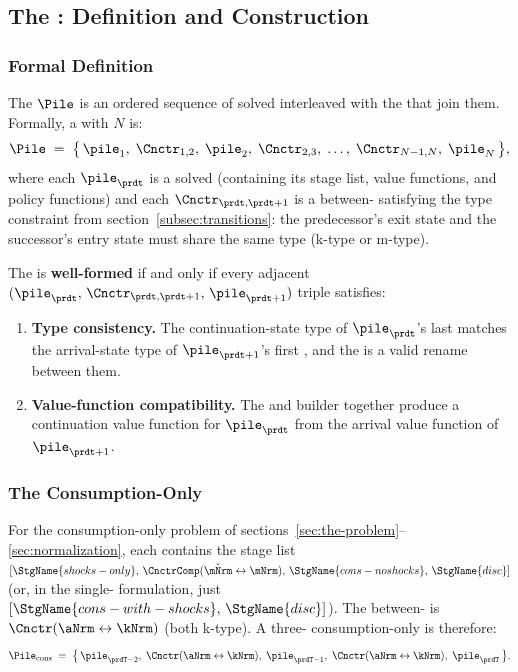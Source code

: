 \documentclass[SolvingMicroDSOPs]{subfiles}
\begin{document}
\subsection{The {\PileName}: Definition and Construction}\label{subsec:building-pile}

\subsubsection{Formal Definition}

The {\pileName} $\Pile$ is an ordered sequence of solved {\intervals}
interleaved with the {\Cncts} that join them. Formally, a {\pileName}
with $N$ {\intervals} is:
\begin{equation}
  \Pile
  \;=\;
  \bigl\{\,
    \pile_1,\;
    \Cnctr_{1,2},\;
    \pile_2,\;
    \Cnctr_{2,3},\;
    \ldots,\;
    \Cnctr_{N-1,N},\;
    \pile_N
  \,\bigr\},
  \label{eq:pile-def}
\end{equation}
where each $\pile_{\prdt}$ is a solved {\interval} (containing its stage
list, value functions, and policy functions) and each $\Cnctr_{\prdt,\prdt+1}$
is a between-{\interval} {\Cnct} satisfying the type constraint from
section~\ref{subsec:transitions}: the predecessor's exit state and the
successor's entry state must share the same type (k-type or m-type).

The {\pileName} is \textbf{well-formed} if and only if every adjacent
$(\pile_{\prdt},\, \Cnctr_{\prdt,\prdt+1},\, \pile_{\prdt+1})$ triple
satisfies:
\begin{enumerate}
  \item \textbf{Type consistency.} The continuation-state type of
    $\pile_{\prdt}$'s last {\stg} matches the arrival-state type of
    $\pile_{\prdt+1}$'s first {\stg}, and the {\Cnct} is a valid rename
    between them.
  \item \textbf{Value-function compatibility.} The {\Cnct} and builder
    together produce a continuation value function for $\pile_{\prdt}$
    from the arrival value function of $\pile_{\prdt+1}$.
\end{enumerate}

\subsubsection{The Consumption-Only {\PileName}}

For the consumption-only problem of
sections~\ref{sec:the-problem}--\ref{sec:normalization}, each {\interval}
contains the stage list
$[\StgName{shocks-only},\, \CnctrComp(\check{\mNrm} \leftrightarrow \mNrm),\,
  \StgName{cons-noshocks},\, \StgName{disc}]$
(or, in the single-{\stg} formulation, just
$[\StgName{cons-with-shocks},\, \StgName{disc}]$).
The between-{\interval} {\Cnct} is
$\Cnctr(\aNrm \leftrightarrow \kNrm)$ (both k-type).
A three-{\interval} consumption-only {\pileName} is therefore:
\begin{equation*}
  \Pile_{\text{cons}}
  \;=\;
  \bigl\{\,
    \pile_{\prdT-2},\;
    \Cnctr(\aNrm \leftrightarrow \kNrm),\;
    \pile_{\prdT-1},\;
    \Cnctr(\aNrm \leftrightarrow \kNrm),\;
    \pile_{\prdT}
  \,\bigr\}.
\end{equation*}
\end{document}
